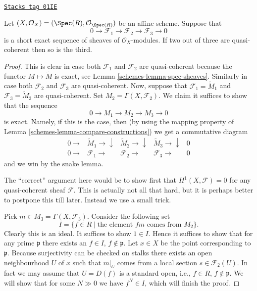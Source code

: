 \begin{lemma}
\label{schemes-lemma-extension-quasi-coherent}
\href{https://stacks.math.columbia.edu/tag/01IE}{\texttt{Stacks tag 01IE}}

Let $(X, \mathcal{O}_X) = (\Spec(R), \mathcal{O}_{\Spec(R)})$
be an affine scheme. Suppose that
$$
0 \to
\mathcal{F}_1 \to
\mathcal{F}_2 \to
\mathcal{F}_3 \to
0
$$
is a short exact sequence of sheaves of $\mathcal{O}_X$-modules.
If two out of three are quasi-coherent then so is the third.
\end{lemma}

\begin{proof}

This is clear in case both $\mathcal{F}_1$ and $\mathcal{F}_2$ are
quasi-coherent because the functor $M \mapsto \widetilde M$
is exact, see Lemma \ref{schemes-lemma-spec-sheaves}.
Similarly in case both $\mathcal{F}_2$ and $\mathcal{F}_3$ are
quasi-coherent. Now, suppose that $\mathcal{F}_1 = \widetilde M_1$ and
$\mathcal{F}_3 = \widetilde M_3$ are quasi-coherent.
Set $M_2 = \Gamma(X, \mathcal{F}_2)$. We claim it suffices to show that
the sequence
$$
0 \to M_1 \to M_2 \to M_3 \to 0
$$
is exact. Namely, if this is the case, then (by using the mapping
property of Lemma \ref{schemes-lemma-compare-constructions}) we get a commutative
diagram
$$
\begin{array}{ccccc}0 \longrightarrow & \widetilde M_1 \longrightarrow\downarrow & \widetilde M_2 \longrightarrow\downarrow & \widetilde M_3 \longrightarrow\downarrow & 0 \\ 0 \longrightarrow & \mathcal{F}_1 \longrightarrow & \mathcal{F}_2 \longrightarrow & \mathcal{F}_3 \longrightarrow & 0\end{array}
$$
and we win by the snake lemma.

\medskip\noindent
The ``correct'' argument here would be to show first
that $H^1(X, \mathcal{F}) = 0$ for any quasi-coherent sheaf $\mathcal{F}$.
This is actually not all that hard, but it is perhaps better to postpone
this till later. Instead we use a small trick.

\medskip\noindent
Pick $m \in M_3 = \Gamma(X, \mathcal{F}_3)$.
Consider the following set
$$
I = \{ f \in R \mid \text{the element }fm\text{ comes from }M_2\}.
$$
Clearly this is an ideal. It suffices to show $1 \in I$.
Hence it suffices to show that for any prime $\mathfrak p$
there exists an $f \in I$, $f \not\in \mathfrak p$.
Let $x \in X$ be the point corresponding to $\mathfrak p$.
Because surjectivity can be checked on stalks
there exists an open neighbourhood $U$ of $x$ such that
$m|_U$ comes from a local section $s \in \mathcal{F}_2(U)$.
In fact we may assume that $U = D(f)$ is a standard open,
i.e., $f \in R$, $f \not \in \mathfrak p$. We will show
that for some $N \gg 0$ we have $f^N \in I$, which
will finish the proof.


\end{proof}
